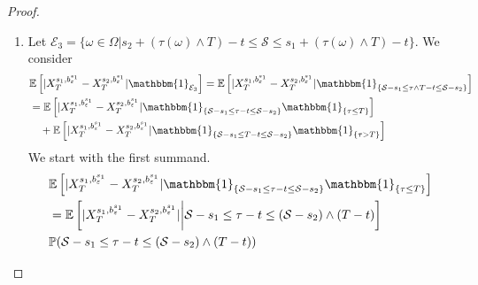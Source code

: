 \documentclass[a4paper]{scrartcl}
\theoremstyle{remark}
\theoremstyle{definition}
\numberwithin{equation}{section}
\newcommand{\ind}{\mathbbm{1}_}
\begin{document}
\begin{proof}
\begin{enumerate}
        \item %
        Let $\mathcal{E}_3=\{\omega \in \Omega|s_2 + (\tau(\omega) \wedge T)-t \leq \mathcal{S} \leq s_1 + (\tau(\omega) \wedge T)-t\}$.
            We consider
            \begin{align*}
                &\mathbb{E}\left[ |X_T^{s_1,b_\varepsilon^{s_1}} - X_T^{s_2,b_\varepsilon^{s_1}}|\ind{\mathcal{E}_3}\right]=
                \mathbb{E}\left[ |X_T^{s_1,b_\varepsilon^{s_1}} - X_T^{s_2,b_\varepsilon^{s_1}}|\ind{\{\mathcal{S}-s_1\leq \tau\wedge T-t \leq \mathcal{S}-s_2\}}\right] \\
                &=\mathbb{E}\left[ |X_T^{s_1,b_\varepsilon^{s_1}} - X_T^{s_2,b_\varepsilon^{s_1}}|\ind{\{\mathcal{S}-s_1\leq \tau-t \leq \mathcal{S}-s_2\}}\ind{\{\tau \leq T\}}\right] \\
                &\quad + \mathbb{E}\left[ |X_T^{s_1,b_\varepsilon^{s_1}} - X_T^{s_2,b_\varepsilon^{s_1}}|\ind{\{\mathcal{S}-s_1\leq T-t \leq \mathcal{S}-s_2\}}\ind{\{\tau > T\}}\right]\\
            \end{align*}
            We start with the first summand.
            \begin{align*}
                &\mathbb{E}\left[ |X_T^{s_1,b_\varepsilon^{s_1}} - X_T^{s_2,b_\varepsilon^{s_1}}|\ind{\{\mathcal{S}-s_1\leq \tau-t \leq \mathcal{S}-s_2\}}\ind{\{\tau \leq T\}}\right] \\
                &= \mathbb{E}\left[ |X_T^{s_1,b_\varepsilon^{s_1}} - X_T^{s_2,b_\varepsilon^{s_1}}|\bigg \vert \mathcal{S}-s_1\leq \tau-t \leq (\mathcal{S}-s_2) \wedge (T-t)\right]\\
                &\hfill \mathbb{P}(\mathcal{S}-s_1\leq \tau-t \leq  (\mathcal{S}-s_2) \wedge (T-t))
            \end{align*}
            

\end{enumerate}
\end{proof}
\end{document}
